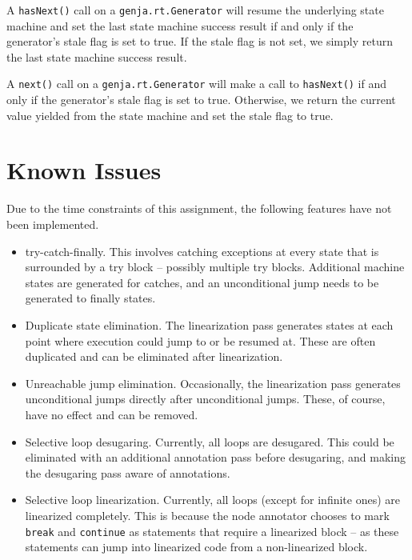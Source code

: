 \documentclass[journal,a4paper]{IEEEtran}
\begin{document}
A \texttt{hasNext()} call on a \texttt{genja.rt.Generator} will resume the underlying state machine
and set the last state machine success result if and only if the generator's stale flag is set to
true. If the stale flag is not set, we simply return the last state machine success result.

A \texttt{next()} call on a \texttt{genja.rt.Generator} will make a call to \texttt{hasNext()} if
and only if the generator's stale flag is set to true. Otherwise, we return the current value
yielded from the state machine and set the stale flag to true.

\section{Known Issues}

Due to the time constraints of this assignment, the following features have not been implemented.

\begin{itemize}
\item try-catch-finally. This involves catching exceptions at every state that is surrounded by
      a try block -- possibly multiple try blocks. Additional machine states are generated for
      catches, and an unconditional jump needs to be generated to finally states.

\item Duplicate state elimination. The linearization pass generates states at each point where
      execution could jump to or be resumed at. These are often duplicated and can be eliminated
      after linearization.

\item Unreachable jump elimination. Occasionally, the linearization pass generates unconditional
      jumps directly after unconditional jumps. These, of course, have no effect and can be
      removed.

\item Selective loop desugaring. Currently, all loops are desugared. This could be eliminated with
      an additional annotation pass before desugaring, and making the desugaring pass aware of
      annotations.

\item Selective loop linearization. Currently, all loops (except for infinite ones) are linearized
      completely. This is because the node annotator chooses to mark \texttt{break} and
      \texttt{continue} as statements that require a linearized block -- as these statements can
      jump into linearized code from a non-linearized block.
\end{itemize}
\end{document}
